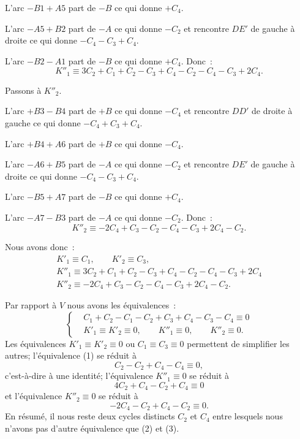 \documentclass{article}
\begin{document}
L'arc $-B1 + A5$ part de $-B$ ce qui donne $+C_{4}$.

L'arc $-A5 + B2$ part de $-A$ ce qui donne $-C_{2}$ et rencontre $DE'$ de gauche à droite ce qui donne $-C_{4} - C_{3} + C_{4}$.

L'arc $-B2 - A1$ part de $-B$ ce qui donne $+C_{4}$.
Donc~:
\[ K''_{1} \equiv 3C_{2} + C_{1} + C_{2} - C_{3} + C_{4} - C_{2} - C_{4} - C_{3} + 2C_{4}. \]


Passons à $K''_{2}$.

L'arc $+B3 - B4$ part de $+B$ ce qui donne $-C_{4}$ et rencontre $DD'$ de droite à gauche ce qui donne $-C_{4} + C_{3} + C_{4}$.

L'arc $+B4 + A6$ part de $+B$ ce qui donne $-C_{4}$.

L'arc $-A6 + B5$ part de $-A$ ce qui donne $-C_{2}$ et rencontre $DE'$ de gauche à droite ce qui donne $-C_{4} - C_{3} + C_{4}$.

L'arc $-B5 + A7$ part de $-B$ ce qui donne $+C_{4}$.

L'arc $-A7 - B3$ part de $-A$ ce qui donne $-C_{2}$.
Donc~:
\[ K''_{2} \equiv -2C_{4} + C_{3} - C_{2} - C_{4} - C_{3} + 2C_{4} - C_{2}. \]

Nous avons donc~:
\[ \begin{gathered} K'_{1} \equiv C_{1}, \qquad K'_{2} \equiv C_{3},\\ K''_{1} \equiv 3C_{2} + C_{1} + C_{2} - C_{3} + C_{4} - C_{2} - C_{4} - C_{3} + 2C_{4}\\ K''_{2} \equiv -2C_{4} + C_{3} - C_{2} - C_{4} - C_{3} + 2C_{4} - C_{2}. \end{gathered} \]

Par rapport à $V$ nous avons les équivalences~:
\[ \left\{ \begin{aligned} &C_{1} + C_{2} - C_{1} - C_{2} + C_{3} + C_{4} - C_{3} - C_{4} \equiv 0\\ &K'_{1} \equiv K'_{2} \equiv 0, \qquad K''_{1} \equiv 0, \qquad K''_{2} \equiv 0. \end{aligned} \right. \tag{1} \]
Les équivalences $K'_{1} \equiv K'_{2} \equiv 0$ ou $C_{1} \equiv C_{3} \equiv 0$ permettent de simplifier les autres; l'équivalence (1) se réduit à
\[ C_{2} - C_{2} + C_{4} - C_{4} \equiv 0, \]
c'est-à-dire à une identité; l'équivalence $K''_{1} \equiv 0$ se réduit à
\[ 4C_{2} + C_{4} - C_{2} + C_{4} \equiv 0 \tag{2} \]
et l'équivalence $K''_{2} \equiv 0$ se réduit à
\[ -2C_{4} - C_{2} + C_{4} - C_{2} \equiv 0. \tag{3} \]
En résumé, il nous reste deux cycles distincts $C_{2}$ et $C_{4}$ entre lesquels nous n'avons pas d'autre équivalence que (2) et (3).
\end{document}
